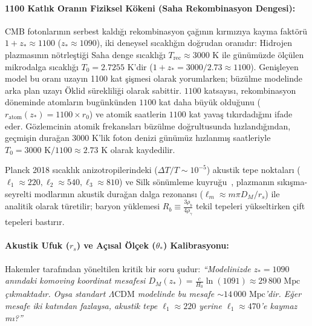 \documentclass[11pt,a4paper]{article}
\begin{document}
\paragraph{1100 Katlık Oranın Fiziksel Kökeni (Saha Rekombinasyon Dengesi):}
CMB fotonlarının serbest kaldığı rekombinasyon çağının kırmızıya kayma faktörü $1+z_* \approx 1100$ ($z_* \approx 1090$), iki deneysel sıcaklığın doğrudan oranıdır: Hidrojen plazmasının nötrleştiği Saha denge sıcaklığı $T_{\mathrm{rec}} \approx 3000\text{ K}$ ile günümüzde ölçülen mikrodalga sıcaklığı $T_0 = 2.7255\text{ K}$'dir ($1+z_* = 3000 / 2.73 \approx 1100$). Genişleyen model bu oranı uzayın 1100 kat şişmesi olarak yorumlarken; büzülme modelinde arka plan uzayı Öklid sürekliliği olarak sabittir. $1100$ katsayısı, rekombinasyon döneminde atomların bugünkünden $1100$ kat daha büyük olduğunu ($r_{\mathrm{atom}}(z_*) = 1100 \times r_0$) ve atomik saatlerin $1100$ kat yavaş tıkırdadığını ifade eder. Gözlemcinin atomik frekansları büzülme doğrultusunda hızlandığından, geçmişin durağan $3000\text{ K}$'lik foton denizi günümüz hızlanmış saatleriyle $T_0 = 3000\text{ K} / 1100 \approx 2.73\text{ K}$ olarak kaydedilir.

Planck 2018 sıcaklık anizotropilerindeki ($\Delta T / T \sim 10^{-5}$) akustik tepe noktaları ($\ell_1 \approx 220, \ell_2 \approx 540, \ell_3 \approx 810$) ve Silk sönümleme kuyruğu~\cite{planck2018}, plazmanın sıkışma-seyrelti modlarının akustik durağan dalga rezonansı ($\ell_m \approx m \pi D_M/r_s$) ile analitik olarak türetilir; baryon yüklemesi $R_b \equiv \frac{3\rho_b}{4\rho_\gamma}$ tekil tepeleri yükseltirken çift tepeleri bastırır.

\paragraph{Akustik Ufuk (\texorpdfstring{$r_s$}{r\_s}) ve Açısal Ölçek (\texorpdfstring{$\theta_*$}{theta\_*}) Kalibrasyonu:}
Hakemler tarafından yöneltilen kritik bir soru şudur: \textit{``Modelinizde $z_* = 1090$ anındaki komoving koordinat mesafesi $D_M(z_*) = \frac{c}{H_0}\ln(1091) \approx 29\,800\text{ Mpc}$ çıkmaktadır. Oysa standart $\Lambda\mathrm{CDM}$ modelinde bu mesafe $\sim 14\,000\text{ Mpc}$'dir. Eğer mesafe iki katından fazlaysa, akustik tepe $\ell_1 \approx 220$ yerine $\ell_1 \approx 470$'e kaymaz mı?''}
\end{document}
